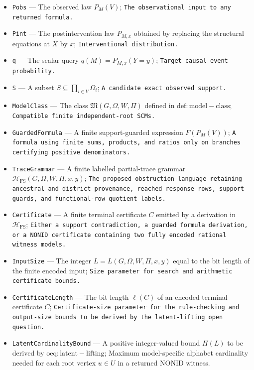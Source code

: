\documentclass{article}
\begin{document}
\begin{itemize}
  \item \texttt{Pobs} --- The observed law \(P_M(V)\); \texttt{The observational input to any returned formula.}
  \item \texttt{Pint} --- The postintervention law \(P_{M,x}\) obtained by replacing the structural equations at \(X\) by \(x\); \texttt{Interventional distribution.}
  \item \texttt{q} --- The scalar query \(q(M)=P_{M,x}(Y=y)\); \texttt{Target causal event probability.}
  \item \texttt{S} --- A subset \(S\subseteq\prod_{i\in V}\Omega_i\); \texttt{A candidate exact observed support.}
  \item \texttt{ModelClass} --- The class \(\mathfrak M(G,\Omega,W,\Pi)\) defined in \(\mathrm{def:model-class}\); \texttt{Compatible finite independent-\allowbreak{}root SCMs.}
  \item \texttt{GuardedFormula} --- A finite support-guarded expression \(F(P_M(V))\); \texttt{A formula using finite sums,\allowbreak{} products,\allowbreak{} and ratios only on branches certifying positive denominators.}
  \item \texttt{TraceGrammar} --- A finite labelled partial-trace grammar \(\mathcal H_{\mathrm{FS}}(G,\Omega,W,\Pi,x,y)\); \texttt{The proposed obstruction language retaining ancestral and district provenance,\allowbreak{} reached response rows,\allowbreak{} support guards,\allowbreak{} and functional-\allowbreak{}row quotient labels.}
  \item \texttt{Certificate} --- A finite terminal certificate \(C\) emitted by a derivation in \(\mathcal H_{\mathrm{FS}}\); \texttt{Either a support contradiction,\allowbreak{} a guarded formula derivation,\allowbreak{} or a NONID certificate containing two fully encoded rational witness models.}
  \item \texttt{InputSize} --- The integer \(L=L(G,\Omega,W,\Pi,x,y)\) equal to the bit length of the finite encoded input; \texttt{Size parameter for search and arithmetic certificate bounds.}
  \item \texttt{CertificateLength} --- The bit length \(\ell(C)\) of an encoded terminal certificate \(C\); \texttt{Certificate-\allowbreak{}size parameter for the rule-\allowbreak{}checking and output-\allowbreak{}size bounds to be derived by the latent-\allowbreak{}lifting open question.}
  \item \texttt{LatentCardinalityBound} --- A positive integer-valued bound \(H(L)\) to be derived by \(\mathrm{oeq:latent-lifting}\); Maximum model-specific alphabet cardinality needed for each root vertex \(u\in U\) in a returned NONID witness.

\end{itemize}
\end{document}
